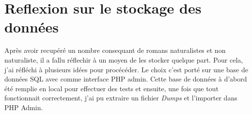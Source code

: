 \section{Reflexion sur le stockage des données}

Après avoir recupéré un nombre consequant de romans naturalistes et non naturaliste, il a fallu réflechir à un moyen de les stocker quelque part. Pour cela, j'ai réfléchi à plusieurs idées pour procécéder. Le choix c'est porté sur une base de données SQL avec comme interface PHP admin. Cette base de données à d'abord été remplie en local pour effectuer des tests et ensuite, une fois que tout fonctionnait correctement, j'ai pu extraire un fichier \textsl{Dumps} et l'importer dans PHP Admin.


